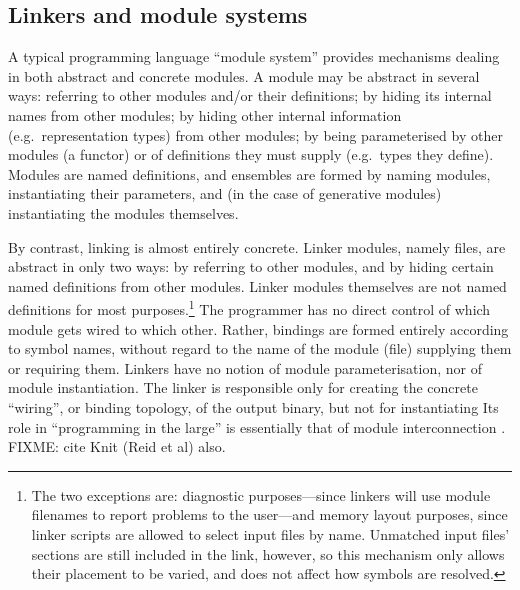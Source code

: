 \subsection{Linkers and module systems}

A typical programming language ``module system'' provides mechanisms 
dealing in both abstract and concrete modules. 
A module may be abstract in several ways: 
referring to other modules and/or their definitions;
by hiding its internal names from other modules;
by hiding other internal information (e.g.\ representation types) from other modules;
by being parameterised by other modules (a functor) 
     or of definitions they must supply (e.g.\ types they define).
Modules are named definitions,
and ensembles are formed by naming modules, instantiating their parameters,
and (in the case of generative modules) instantiating the modules themselves.

By contrast, linking is almost entirely concrete.
Linker modules, namely files, 
are abstract in only two ways: by referring to other modules,
and by hiding certain named definitions from other modules.
Linker modules themselves are not named definitions for most purposes.\footnote{The 
two exceptions are: diagnostic purposes---since linkers will use 
module filenames to report problems to the user---and memory layout purposes,
since linker scripts are allowed to select input files by name.
Unmatched input files' sections are still included in the link, however, so
this mechanism only allows their placement to be varied, and does not affect
how symbols are resolved.}
The programmer has no direct control of which module gets wired to which other.
Rather, bindings are formed entirely according to symbol names,
without regard to the name of the module (file) supplying them or requiring them.
Linkers have no notion of module parameterisation, nor of module instantiation.
The linker is responsible only for creating the concrete ``wiring'', or binding topology, 
of the output binary, but not for instantiating
Its role in ``programming in the large'' is essentially that 
of module interconnection \citet{deremer_programming_1975}.
FIXME: cite Knit (Reid et al) also.

